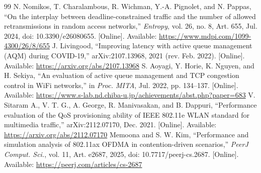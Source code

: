 \documentclass[10pt,twocolumn,letterpaper]{article}
\begin{document}
\begin{thebibliography}{99}
 N. Nomikos, T. Charalambous, R. Wichman, Y.-A. Pignolet, and N. Pappas, ``On the interplay between deadline-constrained traffic and the number of allowed retransmissions in random access networks,'' \emph{Entropy}, vol. 26, no. 8, Art. 655, Jul. 2024, doi: 10.3390/e26080655. [Online]. Available: \url{https://www.mdpi.com/1099-4300/26/8/655}
 J. Livingood, ``Improving latency with active queue management (AQM) during COVID-19,'' arXiv:2107.13968, 2021 (rev. Feb. 2022). [Online]. Available: \url{https://arxiv.org/abs/2107.13968}
 S. Aoyagi, Y. Horie, K. Nguyen, and H. Sekiya, ``An evaluation of active queue management and TCP congestion control in WiFi networks,'' in \emph{Proc. MITA}, Jul. 2022, pp. 134--137. [Online]. Available: \url{https://www.s-lab.nd.chiba-u.jp/achievements/abst.php?paper=683}
 V. Sitaram A., V. T. G., A. George, R. Manivasakan, and B. Dappuri, ``Performance evaluation of the QoS provisioning ability of IEEE 802.11e WLAN standard for multimedia traffic,'' arXiv:2112.07170, Dec. 2021. [Online]. Available: \url{https://arxiv.org/abs/2112.07170}
 Memoona and S. W. Kim, ``Performance and simulation analysis of 802.11ax OFDMA in contention-driven scenarios,'' \emph{PeerJ Comput. Sci.}, vol. 11, Art. e2687, 2025, doi: 10.7717/peerj-cs.2687. [Online]. Available: \url{https://peerj.com/articles/cs-2687}
\end{thebibliography}
\end{document}
